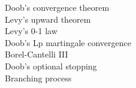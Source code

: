 \documentclass[paper=a4, fontsize=11pt]{scrartcl} %
\numberwithin{equation}{section} %
\numberwithin{figure}{section} %
\numberwithin{table}{section} %
\begin{document}
Doob's convergence theorem\\
Levy's upward theorem\\
Levy's 0-1 law\\
Doob's Lp martingale convergence\\
Borel-Cantelli III\\
Doob's optional stopping\\
Branching process\\
\end{document}
